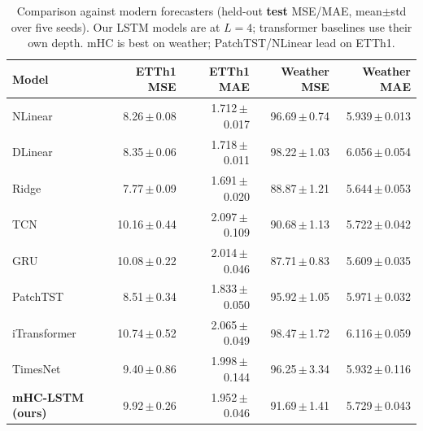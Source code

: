\begin{table}[t]
\centering
\caption{Comparison against modern forecasters (held-out \textbf{test} MSE/MAE, mean$\pm$std over five seeds). Our LSTM models are at $L{=}4$; transformer baselines use their own depth. mHC is best on weather; PatchTST/NLinear lead on ETTh1.}
\label{tab:sota}
\footnotesize
\begin{tabular}{lrrrr}
\toprule
Model & ETTh1 MSE & ETTh1 MAE & Weather MSE & Weather MAE \\
\midrule
NLinear & 8.26\,$\pm$\,0.08 & 1.712\,$\pm$\,0.017 & 96.69\,$\pm$\,0.74 & 5.939\,$\pm$\,0.013 \\
DLinear & 8.35\,$\pm$\,0.06 & 1.718\,$\pm$\,0.011 & 98.22\,$\pm$\,1.03 & 6.056\,$\pm$\,0.054 \\
Ridge & 7.77\,$\pm$\,0.09 & 1.691\,$\pm$\,0.020 & 88.87\,$\pm$\,1.21 & 5.644\,$\pm$\,0.053 \\
TCN & 10.16\,$\pm$\,0.44 & 2.097\,$\pm$\,0.109 & 90.68\,$\pm$\,1.13 & 5.722\,$\pm$\,0.042 \\
GRU & 10.08\,$\pm$\,0.22 & 2.014\,$\pm$\,0.046 & 87.71\,$\pm$\,0.83 & 5.609\,$\pm$\,0.035 \\
PatchTST & 8.51\,$\pm$\,0.34 & 1.833\,$\pm$\,0.050 & 95.92\,$\pm$\,1.05 & 5.971\,$\pm$\,0.032 \\
iTransformer & 10.74\,$\pm$\,0.52 & 2.065\,$\pm$\,0.049 & 98.47\,$\pm$\,1.72 & 6.116\,$\pm$\,0.059 \\
TimesNet & 9.40\,$\pm$\,0.86 & 1.998\,$\pm$\,0.144 & 96.25\,$\pm$\,3.34 & 5.932\,$\pm$\,0.116 \\
\textbf{mHC-LSTM (ours)} & 9.92\,$\pm$\,0.26 & 1.952\,$\pm$\,0.046 & 91.69\,$\pm$\,1.41 & 5.729\,$\pm$\,0.043 \\
\bottomrule
\end{tabular}
\end{table}
